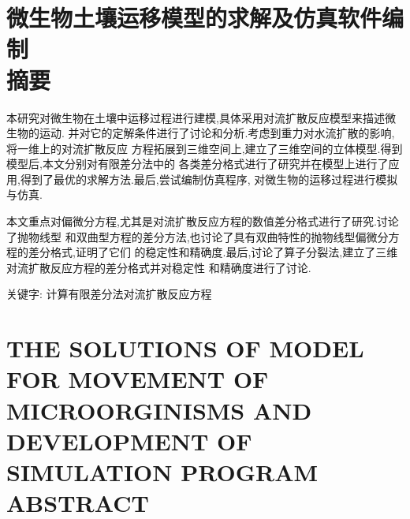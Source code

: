 
\chapter*{微生物土壤运移模型的求解及仿真软件编制\\[1.5em]
摘\qquad 要}
本研究对微生物在土壤中运移过程进行建模,具体采用对流扩散反应模型来描述微生物的运动.
并对它的定解条件进行了讨论和分析.考虑到重力对水流扩散的影响,将一维上的对流扩散反应
方程拓展到三维空间上,建立了三维空间的立体模型.得到模型后,本文分别对有限差分法中的
各类差分格式进行了研究并在模型上进行了应用,得到了最优的求解方法.最后,尝试编制仿真程序,
对微生物的运移过程进行模拟与仿真.\par
本文重点对偏微分方程,尤其是对流扩散反应方程的数值差分格式进行了研究.讨论了抛物线型
和双曲型方程的差分方法,也讨论了具有双曲特性的抛物线型偏微分方程的差分格式,证明了它们
的稳定性和精确度.最后,讨论了算子分裂法,建立了三维对流扩散反应方程的差分格式并对稳定性
和精确度进行了讨论.\par
\vspace*{\baselineskip}
{\heiti 关键字: 计算\quad 有限差分法\quad 对流扩散反应方程}
\clearpage{\pagestyle{empty}\cleardoublepage}
\chapter*{THE SOLUTIONS OF MODEL FOR MOVEMENT OF MICROORGINISMS AND DEVELOPMENT OF SIMULATION PROGRAM\\[2em]
ABSTRACT}

